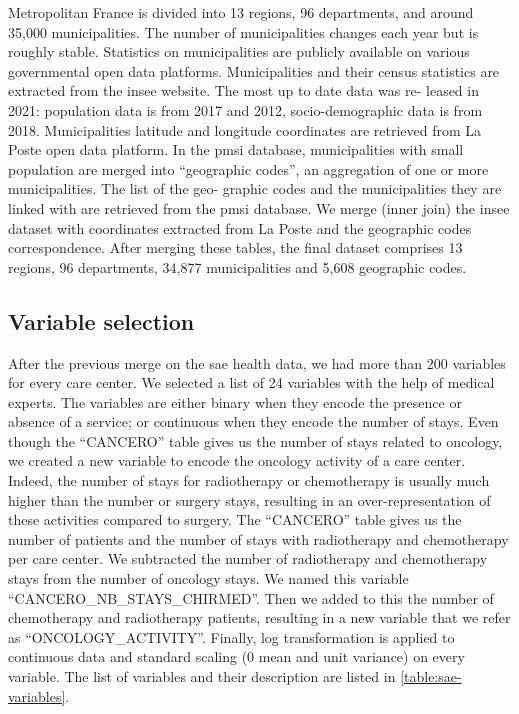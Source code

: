 Metropolitan France is divided into 13 regions, 96 departments, and around 35,000 municipalities. The number of municipalities changes each year but is roughly stable. Statistics on municipalities are publicly available on various governmental open data platforms. Municipalities and their census statistics are extracted from the \ac{insee} website. The most up to date data was re- leased in 2021: population data is from 2017 and 2012, socio-demographic data is from 2018. Municipalities latitude and longitude coordinates are retrieved from La Poste open data platform. In the \ac{pmsi} database, municipalities with small population are merged into ``geographic codes'', an aggregation of one or more municipalities. The list of the geo- graphic codes and the municipalities they are linked with are retrieved from the \ac{pmsi} database. We merge (inner join) the \ac{insee} dataset with coordinates extracted from La Poste and the geographic codes correspondence. After merging these tables, the final dataset comprises 13 regions, 96 departments, 34,877 municipalities and 5,608 geographic codes.

\subsection{Variable selection}

After the previous merge on the \ac{sae} health data, we had more than 200 variables for every care center. We selected a list of 24 variables with the help of medical experts. The variables are either binary when they encode the presence or absence of a service; or continuous when they encode the number of stays. Even though the ``CANCERO'' table gives us the number of stays related to oncology, we created a new variable to encode the oncology activity of a care center. Indeed, the number of stays for radiotherapy or chemotherapy is usually much higher than the number or surgery stays, resulting in an over-representation of these activities compared to surgery. The ``CANCERO'' table gives us the number of patients and the number of stays with radiotherapy and chemotherapy per care center. We subtracted the number of radiotherapy and chemotherapy stays from the number of oncology stays. We named this variable ``CANCERO\_NB\_STAYS\_CHIRMED''. Then we added to this the number of chemotherapy and radiotherapy patients, resulting in a new variable that we refer as ``ONCOLOGY\_ACTIVITY''. Finally, log transformation is applied to continuous data and standard scaling (0 mean and unit variance) on every variable. The list of variables and their description are listed in \cref{table:sae-variables}.

